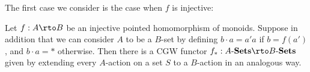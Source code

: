 \documentclass[11pt]{amsart}
\renewcommand{\ss}{\mathord{\sslash}}
\begin{document}
The first case we consider is the case when $f$ is injective:







\begin{lemma} \label{lem:goodinj}
Let $f:A \rto B$ be an injective pointed homomorphism of monoids.  Suppose in addition that we can consider $A$ to be a $B$-set by defining $b \cdot a = a'a$ if $b = f(a')$, and $b \cdot a = *$ otherwise.  Then there is a CGW functor $f_*:\ASets \rto \BSets$ given by extending every $A$-action on a set $S$ to a $B$-action in an analogous way. 
\end{lemma}
\end{document}
